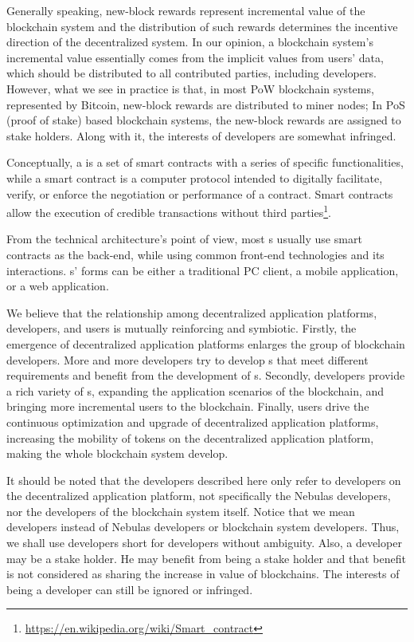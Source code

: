 Generally speaking,  new-block rewards represent incremental value of the
blockchain system and the distribution of such rewards determines the incentive
direction of the decentralized system. In our opinion, a blockchain system's
incremental value essentially comes from the implicit values from users' data,
which should be distributed to all contributed parties, including \dapp
developers. However, what we see in practice is that, in most PoW blockchain
systems, represented by Bitcoin, new-block rewards are distributed to miner
nodes; In PoS (proof of stake) based blockchain systems, the new-block rewards are assigned to  stake holders. Along with it, the interests of \dapp developers are somewhat infringed.


Conceptually, a \dapp is a set of smart contracts with a series of specific
functionalities, while a smart contract is a computer protocol intended to
digitally facilitate, verify, or enforce the negotiation or performance of a
contract. Smart contracts allow the execution of credible transactions
without third
parties\footnote{\url{https://en.wikipedia.org/wiki/Smart\_contract}}.

From the technical architecture's point of view, most {\dapp}s usually use smart
contracts as the back-end, while using common front-end technologies and its
interactions. {\dapp}s' forms can be either a traditional PC client, a mobile
application, or a web application.

We believe that the relationship among decentralized application platforms, \dapp developers, and \dapp users is mutually reinforcing and symbiotic. Firstly, the emergence of decentralized application platforms enlarges the group of blockchain developers. More and more developers try to develop {\dapp}s that meet different requirements and benefit from the development of {\dapp}s. Secondly, \dapp developers provide a rich variety of {\dapp}s, expanding the application scenarios of the blockchain, and bringing more incremental users to the blockchain. Finally, \dapp users drive the continuous optimization and upgrade of decentralized application platforms, increasing the mobility of tokens on the decentralized application platform, making the whole blockchain system develop.

It should be noted that the developers described here only refer to developers on the decentralized application platform, not specifically the Nebulas developers, nor the developers of the blockchain system itself.
Notice that we mean \dapp developers instead of Nebulas \dapp developers or
blockchain system developers. Thus, we shall use developers short for \dapp
developers without ambiguity. Also, a \dapp developer may be a stake holder.
He may benefit from being a stake holder and that benefit is not considered
as sharing the increase in value of blockchains. The interests of being a developer can still be ignored or infringed.



